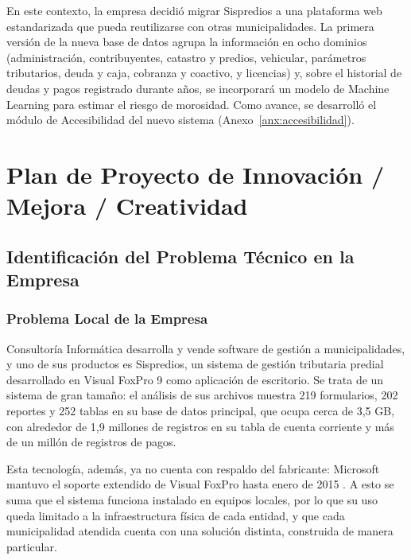 \documentclass[12pt,a4paper]{report}
\begin{document}
En este contexto, la empresa decidió migrar Sispredios a una plataforma web estandarizada que pueda reutilizarse con otras municipalidades. La primera versión de la nueva base de datos agrupa la información en ocho dominios (administración, contribuyentes, catastro y predios, vehicular, parámetros tributarios, deuda y caja, cobranza y coactivo, y licencias) y, sobre el historial de deudas y pagos registrado durante años, se incorporará un modelo de Machine Learning para estimar el riesgo de morosidad. Como avance, se desarrolló el módulo de Accesibilidad del nuevo sistema (Anexo~\ref{anx:accesibilidad}).

\chapter{Plan de Proyecto de Innovación / Mejora / Creatividad}

\section{Identificación del Problema Técnico en la Empresa}

\subsection{Problema Local de la Empresa}
\label{sec:problema-local}

Consultoría Informática desarrolla y vende software de gestión a municipalidades, y uno de sus productos es Sispredios, un sistema de gestión tributaria predial desarrollado en Visual FoxPro 9 como aplicación de escritorio. Se trata de un sistema de gran tamaño: el análisis de sus archivos muestra 219 formularios, 202 reportes y 252 tablas en su base de datos principal, que ocupa cerca de 3,5 GB, con alrededor de 1,9 millones de registros en su tabla de cuenta corriente y más de un millón de registros de pagos. %

Esta tecnología, además, ya no cuenta con respaldo del fabricante: Microsoft mantuvo el soporte extendido de Visual FoxPro hasta enero de 2015 \parencite{taft2007}. A esto se suma que el sistema funciona instalado en equipos locales, por lo que su uso queda limitado a la infraestructura física de cada entidad, y que cada municipalidad atendida cuenta con una solución distinta, construida de manera particular.
\end{document}
